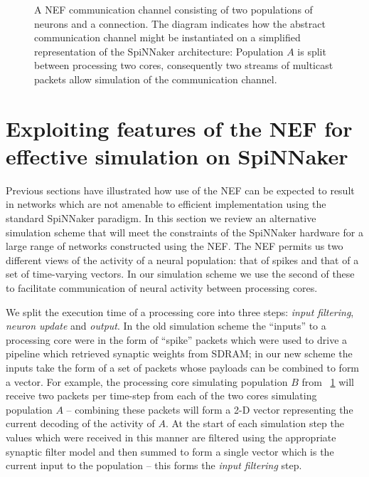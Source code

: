 \documentclass[conference]{IEEEtran}
\begin{document}
  \begin{figure}
    \centering
    
    \caption{A NEF communication channel consisting of two populations of neurons and a connection.
             The diagram indicates how the abstract communication channel might be instantiated on a simplified representation of the SpiNNaker architecture:
             Population $A$ is split between processing two cores, consequently two streams of multicast packets allow simulation of the communication channel.
    }
    \label{fig:background/comms-channel}
  \end{figure}

  \section{Exploiting features of the NEF for effective simulation on SpiNNaker}

  Previous sections have illustrated how use of the NEF can be expected to result in networks which are not amenable to efficient implementation using the standard SpiNNaker paradigm.
  In this section we review an alternative simulation scheme that will meet the constraints of the SpiNNaker hardware for a large range of networks constructed using the NEF.
  The NEF permits us two different views of the activity of a neural population: that of spikes and that of a set of time-varying vectors.
  In our simulation scheme we use the second of these to facilitate communication of neural activity between processing cores.

  We split the execution time of a processing core into three steps: \textit{input filtering}, \textit{neuron update} and \textit{output}.
  In the old simulation scheme the ``inputs'' to a processing core were in the form of ``spike'' packets which were used to drive a pipeline which retrieved synaptic weights from SDRAM; in our new scheme the inputs take the form of a set of packets whose payloads can be combined to form a vector.
  For example, the processing core simulating population $B$ from \figurename~\ref{fig:background/comms-channel} will receive two packets per time-step from each of the two cores simulating population $A$ -- combining these packets will form a 2-D vector representing the current decoding of the activity of $A$.
  At the start of each simulation step the values which were received in this manner are filtered using the appropriate synaptic filter model and then summed to form a single vector which is the current input to the population -- this forms the \textit{input filtering} step.
\end{document}
